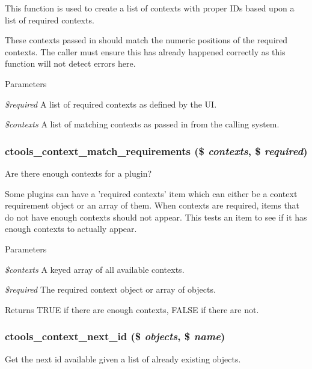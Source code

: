 This function is used to create a list of contexts with proper IDs based upon a list of required contexts.

These contexts passed in should match the numeric positions of the required contexts. The caller must ensure this has already happened correctly as this function will not detect errors here.


\begin{DoxyParams}{Parameters}
\item[{\em \$required}]A list of required contexts as defined by the UI. \item[{\em \$contexts}]A list of matching contexts as passed in from the calling system. \end{DoxyParams}
\hypertarget{context_8inc_a786d98ab982e644f15a29765bd6e5b8a}{
\subsubsection[{ctools\_\-context\_\-match\_\-requirements}]{\setlength{\rightskip}{0pt plus 5cm}ctools\_\-context\_\-match\_\-requirements (\$ {\em contexts}, \/  \$ {\em required})}}
\label{context_8inc_a786d98ab982e644f15a29765bd6e5b8a}
Are there enough contexts for a plugin?

Some plugins can have a 'required contexts' item which can either be a context requirement object or an array of them. When contexts are required, items that do not have enough contexts should not appear. This tests an item to see if it has enough contexts to actually appear.


\begin{DoxyParams}{Parameters}
\item[{\em \$contexts}]A keyed array of all available contexts. \item[{\em \$required}]The required context object or array of objects.\end{DoxyParams}
\begin{DoxyReturn}{Returns}
TRUE if there are enough contexts, FALSE if there are not. 
\end{DoxyReturn}
\hypertarget{context_8inc_aa979b980941194295a45cd5000ff12ae}{
\subsubsection[{ctools\_\-context\_\-next\_\-id}]{\setlength{\rightskip}{0pt plus 5cm}ctools\_\-context\_\-next\_\-id (\$ {\em objects}, \/  \$ {\em name})}}
\label{context_8inc_aa979b980941194295a45cd5000ff12ae}
Get the next id available given a list of already existing objects.

